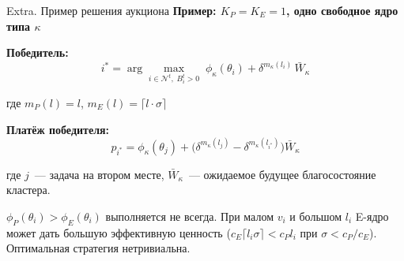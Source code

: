 \documentclass[aspectratio=169,11pt]{beamer}
\begin{document}
\begin{frame}{Extra. Пример решения аукциона}
        \textbf{Пример: $K_P = K_E = 1$, одно свободное ядро типа $\kappa$}

        \vspace{0.2cm}
        \textbf{Победитель:}
        $$i^* = \arg\max_{i \in \mathcal{N}^t,\; B_i^t > 0}\;
        \phi_\kappa(\theta_i) + \delta^{m_\kappa(l_i)}\,\bar{W}_\kappa$$

        где $m_P(l) = l$,\; $m_E(l) = \lceil l\cdot\sigma \rceil$

        \vspace{0.2cm}
        \textbf{Платёж победителя:}
        $$p_{i^*} = \phi_\kappa(\theta_j) +
                \bigl(\delta^{m_\kappa(l_j)} - \delta^{m_\kappa(l_{i^*})}\bigr)
        \bar{W}_\kappa$$

        где $j$~--- задача на втором месте,
        $\bar W_\kappa$~--- ожидаемое будущее благосостояние кластера.

        \vspace{0.2cm}
        \begin{shadowbox}
                \footnotesize
                $\phi_P(\theta_i) > \phi_E(\theta_i)$ выполняется не всегда.
                При малом $v_i$ и большом $l_i$ E-ядро может дать
                большую эффективную ценность ($c_E \lceil l_i\sigma\rceil
                < c_P l_i$ при $\sigma < c_P/c_E$).
                Оптимальная стратегия нетривиальна.
        \end{shadowbox}
\end{frame}
\addtocounter{framenumber}{-1}
\end{document}
